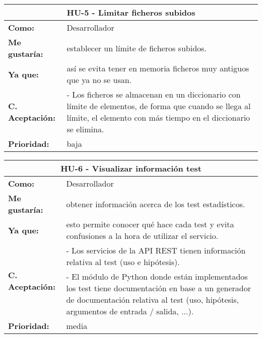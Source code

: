 	

\begin{table}[H]
	\begin{tabular}{| p{3cm}| p{11cm} |}
		\hline
		\multicolumn{2}{|c|}{\textbf{HU-5} - Limitar ficheros subidos} \\ \hline
		\textbf{Como:} & Desarrollador \\ \hline
		\textbf{Me gustaría:} & establecer un límite de ficheros subidos. \\ \hline
		\textbf{Ya que:} & así se evita tener en memoria ficheros muy antiguos que ya no se usan. \\ \hline
		\textbf{C. Aceptación:} & - Los ficheros se almacenan en un diccionario con límite de elementos, de forma que cuando se llega al límite, el elemento con más tiempo en el diccionario se elimina. \\ \hline
		\textbf{\textbf{Prioridad:}} & baja \\ \hline
	\end{tabular}
\end{table}


\begin{table}[H]
	\begin{tabular}{| p{3cm}| p{11cm} |}
		\hline
		\multicolumn{2}{|c|}{\textbf{HU-6} - Visualizar información test} \\ \hline
		\textbf{Como:} & Desarrollador \\ \hline
		\textbf{Me gustaría:} & obtener información acerca de los test estadísticos. \\ \hline
		\textbf{Ya que:} & esto permite conocer qué hace cada test y evita confusiones a la hora de utilizar el servicio. \\ \hline
		\multirow{2}{11cm}{\textbf{C. Aceptación:}} & - Los servicios de la API REST tienen información relativa al test (uso e hipótesis). \\
		& - El módulo de Python donde están implementados los test tiene documentación en base a un generador de documentación relativa al test (uso, hipótesis, argumentos de entrada / salida, ...). \\ \hline 
		\textbf{\textbf{Prioridad:}} & media \\ \hline
	\end{tabular}
\end{table}


